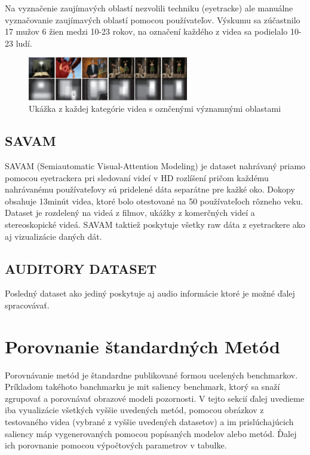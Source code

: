 Na vyznačenie zaujímavých oblastí nezvolili techniku (eyetracke) ale manuálne vyznačovanie zaujímavých oblastí pomocou používateľov. Výskumu sa zúčastnilo 17 mužov 6 žien medzi 10-23 rokov, na označení každého z videa sa podielalo 10-23 ludí.

\begin{figure}[H]
 \centering
 \includegraphics[width=7cm]{pics/rsd.png}
 \caption{Ukážka z každej kategórie videa s oznčenými významnými oblastami}
\end{figure}
\vspace{10mm}

\subsection{SAVAM}
SAVAM (Semiautomatic Visual-Attention Modeling) je dataset nahrávaný priamo pomocou eyetrackera pri sledovaní videí v HD rozlíšení pričom každému nahrávanému používateľovy sú pridelené dáta separátne pre kažké oko. Dokopy obsahuje 13minút videa, ktoré bolo otestované na 50 používateľoch rôzneho veku. Dataset je rozdelený na videá z filmov, ukážky z komerčných videí a stereoskopické videá. SAVAM taktiež poskytuje všetky raw dáta z eyetrackere ako aj vizualizácie daných dát\cite{savam}.

\subsection{AUDITORY DATASET}
Posledný dataset ako jediný poskytuje aj audio informácie ktoré je možné ďalej spracovávať.


\section{Porovnanie štandardných Metód}
Porovnávanie metód je štandardne publikované formou ucelených benchmarkov. Príkladom takéhoto banchmarku je mit saliency benchmark\cite{mit-saliency-benchmark}, ktorý sa snaží zgrupovať a porovnávať obrazové modeli pozornosti. V tejto sekcií ďalej uvedieme iba vyualizácie všetkých vyššie uvedených metód, pomocou obrázkov z testovaného videa (vybrané z vyššie uvedených datasetov) a im prislúchajúcich saliency máp vygenerovaných pomocou popísaných modelov alebo metód. Ďalej ich porovnanie pomocou výpočtových parametrov v tabulke.

